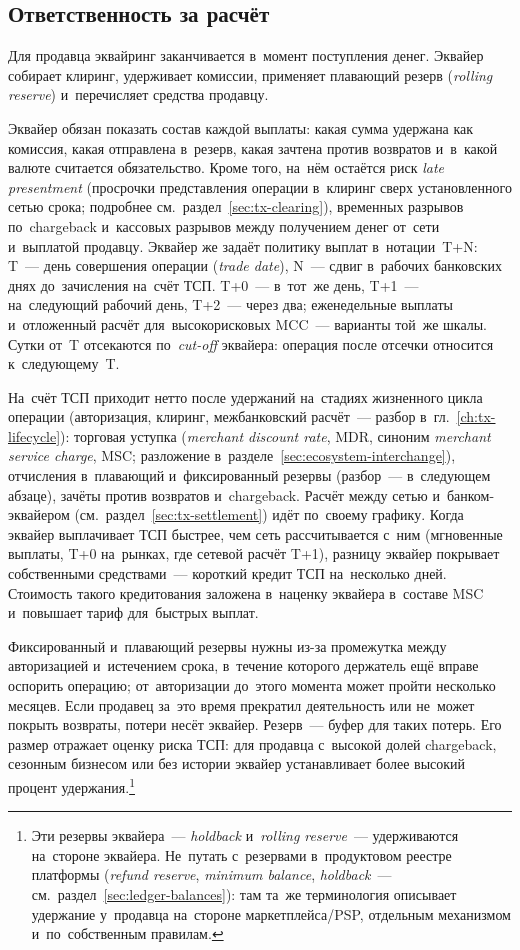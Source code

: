 \subsection*{Ответственность за расчёт}

Для продавца эквайринг заканчивается в~момент поступления денег. Эквайер
собирает клиринг, удерживает комиссии, применяет плавающий резерв
(\textit{rolling reserve}) и~перечисляет средства продавцу.

Эквайер обязан показать состав каждой выплаты: какая сумма удержана как
комиссия, какая отправлена в~резерв, какая зачтена против возвратов и~в~какой
валюте считается обязательство. Кроме того, на~нём остаётся риск \textit{late
presentment} (просрочки представления операции в~клиринг сверх установленного
сетью срока; подробнее см.~раздел~\ref{sec:tx-clearing}), временных разрывов
по~chargeback и~кассовых разрывов между получением денег от~сети и~выплатой
продавцу. Эквайер же задаёт политику выплат в~нотации~T+N: T~--- день
совершения операции (\textit{trade date}), N~--- сдвиг в~рабочих банковских
днях до~зачисления на~счёт ТСП. T+0~--- в~тот~же день, T+1~--- на~следующий
рабочий день, T+2~--- через два; еженедельные выплаты и~отложенный расчёт
для~высокорисковых MCC~--- варианты той~же шкалы. Сутки от~T отсекаются
по~\textit{cut-off} эквайера: операция после отсечки относится к~следующему~T.

На~счёт ТСП приходит нетто после удержаний на~стадиях жизненного цикла операции
(авторизация, клиринг, межбанковский расчёт~--- разбор
в~гл.~\ref{ch:tx-lifecycle}): торговая уступка (\textit{merchant discount
  rate}, MDR, синоним \textit{merchant service charge}, MSC; разложение
в~разделе~\ref{sec:ecosystem-interchange}), отчисления в~плавающий
и~фиксированный резервы (разбор~--- в~следующем абзаце), зачёты против
возвратов и~chargeback. Расчёт между сетью и~банком-эквайером
(см.~раздел~\ref{sec:tx-settlement}) идёт по~своему графику. Когда эквайер
выплачивает ТСП быстрее, чем сеть рассчитывается с~ним (мгновенные выплаты, T+0
на~рынках, где сетевой расчёт T+1), разницу эквайер покрывает собственными
средствами~--- короткий кредит ТСП на~несколько дней. Стоимость такого
кредитования заложена в~наценку эквайера в~составе MSC и~повышает тариф
для~быстрых выплат.

Фиксированный и~плавающий резервы нужны из-за промежутка между
авторизацией и~истечением срока, в~течение которого держатель ещё вправе
оспорить операцию; от~авторизации до~этого момента может пройти несколько
месяцев. Если продавец за~это время прекратил деятельность или не~может покрыть
возвраты, потери несёт эквайер. Резерв~--- буфер для таких потерь.
Его размер отражает оценку риска ТСП: для продавца с~высокой долей chargeback,
сезонным бизнесом или без истории эквайер устанавливает более высокий процент
удержания.\footnote{Эти резервы эквайера~--- \textit{holdback} и~\textit{rolling
  reserve}~--- удерживаются на~стороне эквайера. Не~путать с~резервами
  в~продуктовом реестре платформы (\textit{refund reserve}, \textit{minimum
    balance}, \textit{holdback}~---
  см.~раздел~\ref{sec:ledger-balances}): там та~же терминология описывает
  удержание у~продавца на~стороне маркетплейса\slash PSP, отдельным механизмом
и~по~собственным правилам.}

